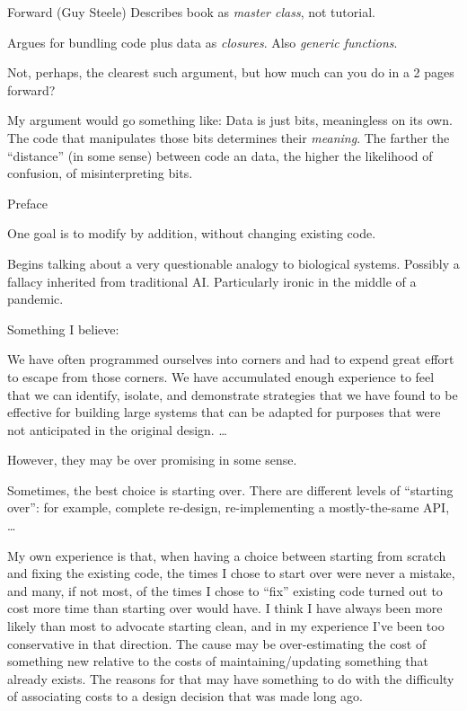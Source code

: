 \documentclass[12pt]{PalisadesLakesBook}
\begin{document}
\begin{plSection}{}
\begin{plSection}{Forward (Guy Steele)}
Describes book as \emph{master class}, not tutorial.

Argues for bundling code plus data as \emph{closures}. 
Also \emph{generic functions}.

Not, perhaps, the clearest such argument, but how much can you do
in a 2 pages forward?

My argument would go something like:
Data is just bits, meaningless on its own.
The code that manipulates those bits determines their 
\emph{meaning}.
The farther the ``distance'' (in some sense) 
between code an data, 
the higher the likelihood of confusion,
of misinterpreting bits. 

\end{plSection}%
\begin{plSection}{Preface}

One goal is to modify by addition, 
without changing existing code.

Begins talking about a very questionable analogy 
to biological systems.
Possibly a fallacy inherited from traditional AI.
Particularly ironic in the middle of a pandemic.

Something I believe:
\begin{plQuote}
{}{}
We have often programmed ourselves into corners
and had to expend great effort to escape from those corners.
We have accumulated enough experience to feel that we can
identify, isolate, and demonstrate strategies
that we have found to be effective for building large systems
that can be adapted for purposes 
that were not anticipated in the original design. {\ldots}
\end{plQuote}
However, they may be over promising in some sense.

Sometimes, the best choice is starting over.
There are different levels of ``starting over'':
for example, complete re-design, 
re-implementing a mostly-the-same API, {\ldots}

My own experience is that, when having a choice
between starting from scratch and fixing the existing code,
the times I chose to start over were never a mistake,
and many, if not most, of the times I chose to ``fix'' existing
code turned out to cost more time than starting over would have.
I think I have always been more likely than most 
                to advocate starting clean,
and in my experience I've been too conservative in that direction.
The cause may be over-estimating the cost of something new
relative to the costs of maintaining/updating something that
already exists. The reasons for that may have something to do
with the difficulty of associating costs to a design decision
that was made long ago.


\end{plSection}
\end{plSection}
\end{document}
